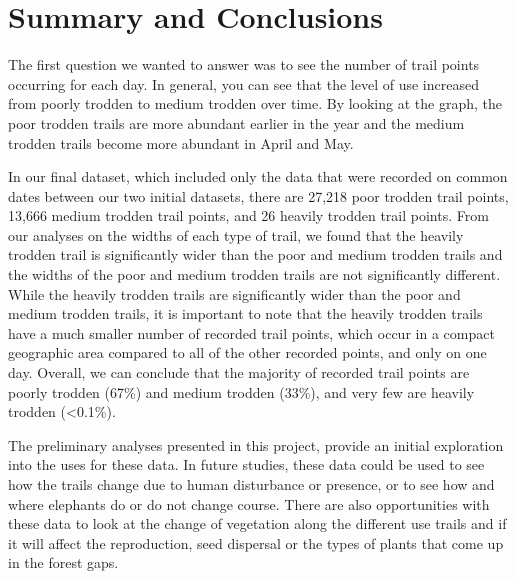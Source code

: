 \documentclass[12pt,]{article}
\begin{document}
\newpage

\hypertarget{summary-and-conclusions}{%
\section{Summary and Conclusions}\label{summary-and-conclusions}}

The first question we wanted to answer was to see the number of trail
points occurring for each day. In general, you can see that the level of
use increased from poorly trodden to medium trodden over time. By
looking at the graph, the poor trodden trails are more abundant earlier
in the year and the medium trodden trails become more abundant in April
and May.

In our final dataset, which included only the data that were recorded on
common dates between our two initial datasets, there are 27,218 poor
trodden trail points, 13,666 medium trodden trail points, and 26 heavily
trodden trail points. From our analyses on the widths of each type of
trail, we found that the heavily trodden trail is significantly wider
than the poor and medium trodden trails and the widths of the poor and
medium trodden trails are not significantly different. While the heavily
trodden trails are significantly wider than the poor and medium trodden
trails, it is important to note that the heavily trodden trails have a
much smaller number of recorded trail points, which occur in a compact
geographic area compared to all of the other recorded points, and only
on one day. Overall, we can conclude that the majority of recorded trail
points are poorly trodden (67\%) and medium trodden (33\%), and very few
are heavily trodden (\textless{}0.1\%).

The preliminary analyses presented in this project, provide an initial
exploration into the uses for these data. In future studies, these data
could be used to see how the trails change due to human disturbance or
presence, or to see how and where elephants do or do not change course.
There are also opportunities with these data to look at the change of
vegetation along the different use trails and if it will affect the
reproduction, seed dispersal or the types of plants that come up in the
forest gaps.
\end{document}
